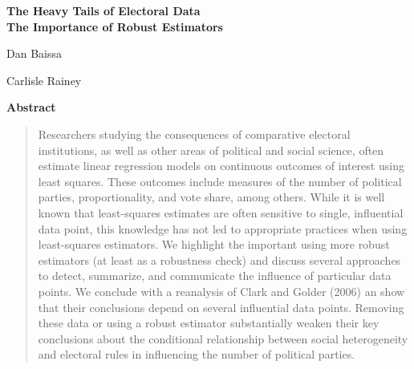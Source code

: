 \documentclass[10pt]{article}
\begin{document}
\begin{center}
{\LARGE \textbf{The Heavy Tails of Electoral Data}}\\\vspace{2mm}
{ \textbf{The Importance of Robust Estimators}}\\\vspace{2mm}


\vspace{10mm}

Dan Baissa

\vspace{3mm}

Carlisle Rainey
\end{center}

\vspace{10mm}

{\centerline{\textbf{Abstract}}}
\begin{quote}\noindent
Researchers studying the consequences of comparative electoral institutions, as well as other areas of political and social science, often estimate linear regression models on continuous outcomes of interest using least squares. These outcomes include measures of the number of political parties, proportionality, and vote share, among others. While it is well known that least-squares estimates are often sensitive to single, influential data point, this knowledge has not led to appropriate practices when using least-squares estimators. We highlight the important using more robust estimators (at least as a robustness check) and discuss several approaches to detect, summarize, and communicate the influence of particular data points. We conclude with a reanalysis of Clark and Golder (2006) an show that their conclusions depend on several influential data points. Removing these data or using a robust estimator substantially weaken their key conclusions about the conditional relationship between social heterogeneity and electoral rules in influencing the number of political parties.
 \end{quote}
\end{document}
